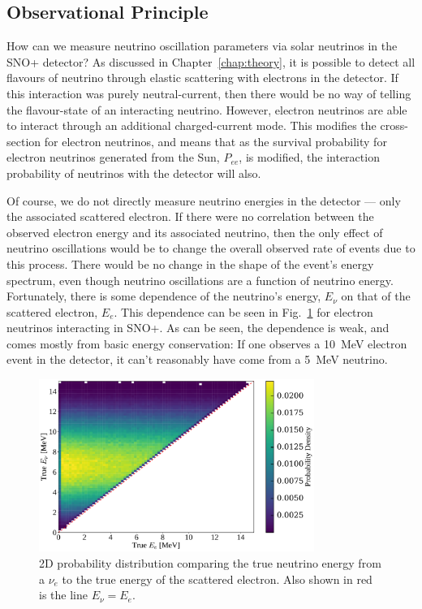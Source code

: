 \subsection{Observational Principle}
How can we measure neutrino oscillation parameters via solar neutrinos in the SNO+ detector? As discussed in Chapter~\ref{chap:theory}, %
it is possible to detect all flavours of neutrino through elastic scattering with electrons in the detector. If this interaction was purely neutral-current, then there would be no way of telling the flavour-state of an interacting neutrino. However, electron neutrinos are able to interact through an additional charged-current mode. This modifies the cross-section for electron neutrinos, and means that as the survival probability for electron neutrinos generated from the Sun, $P_{ee}$, is modified, the interaction probability of neutrinos with the detector will also.

Of course, we do not directly measure neutrino energies in the detector --- only the associated scattered electron. If there were no correlation between the observed electron energy and its associated neutrino, then the only effect of neutrino oscillations would be to change the overall observed rate of events due to this process. There would be no change in the shape of the event's energy spectrum, even though neutrino oscillations are a function of neutrino energy. Fortunately, there is some dependence of the neutrino's energy, $E_{\nu}$ on that of the scattered electron, $E_{e}$. This dependence can be seen in Fig.~\ref{fig:nu_elec_energy_dependence} for \beight{} electron neutrinos interacting in SNO+. %
As can be seen, the dependence is weak, and comes mostly from basic energy conservation: If one observes a \SI{10}{\MeV} electron event in the detector, it can't reasonably have come from a \SI{5}{\MeV} neutrino.

\begin{figure}
    \centering
    \includegraphics[width=0.8\textwidth]{6_SolarAnalysis/images/b8_eelectrue_vs_enutrue.pdf}
    \caption[True \beight{} $E_{\nu}$ versus true $E_{e}$.]{2D probability distribution comparing the true neutrino energy from a \beight{} $\nu_{e}$ to the true energy of the scattered electron. Also shown in red is the line $E_{\nu} = E_{e}$.}
    \label{fig:nu_elec_energy_dependence}
\end{figure}

